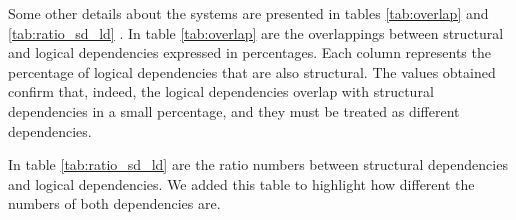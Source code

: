 \documentclass[runningheads]{comsis2}
\begin{document}
Some other details about the systems are presented in tables \ref{tab:overlap} and \ref{tab:ratio_sd_ld} . In table \ref{tab:overlap} are the overlappings between structural and logical dependencies expressed in percentages. Each column represents the percentage of logical dependencies that are also structural. 
The values obtained confirm that, indeed, the logical dependencies overlap with structural dependencies in a small percentage, and they must be treated as different dependencies.

In table \ref{tab:ratio_sd_ld} are the ratio numbers between structural dependencies and logical dependencies. We added this table to highlight how different the numbers of both dependencies are.


\begin{table}[!h]
\setlength\tabcolsep{3pt}
\caption{Percentage of logical dependencies that are also structural dependencies}
\label{tab:overlap}
\centering
{}
\end{table}


\begin{table}[!h]
\setlength\tabcolsep{3.5pt}
\caption{Ratio between structural and logical dependencies (SD/LD)}
\label{tab:ratio_sd_ld}
\centering
{}
\end{table}
\end{document}
